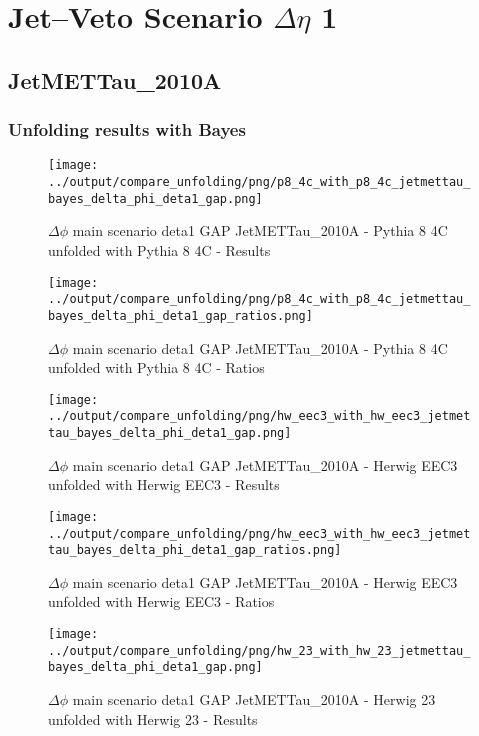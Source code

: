 \documentclass[11pt]{book}
\begin{document}
\cleardoublepage
\chapter{Jet--Veto Scenario $\Delta\eta$ 1}
\section{JetMETTau\_2010A}
\subsection{Unfolding results with Bayes}

\begin{figure}[ht]
\centering
\texttt{[image: ../output/compare\_unfolding/png/p8\_4c\_with\_p8\_4c\_jetmettau\_bayes\_delta\_phi\_deta1\_gap.png]}
\caption{$\Delta\phi$ main scenario deta1 GAP JetMETTau\_2010A - Pythia 8 4C unfolded with Pythia 8 4C - Results}
\label{p8_p8_jetmettau_bayes_delta_phi_deta1_gap_a}
\end{figure}

\begin{figure}[ht]
\centering
\texttt{[image: ../output/compare\_unfolding/png/p8\_4c\_with\_p8\_4c\_jetmettau\_bayes\_delta\_phi\_deta1\_gap\_ratios.png]}
\caption{$\Delta\phi$ main scenario deta1 GAP JetMETTau\_2010A - Pythia 8 4C unfolded with Pythia 8 4C - Ratios}
\label{p8_p8_jetmettau_bayes_delta_phi_deta1_gap_b}
\end{figure}

\begin{figure}[ht]
\centering
\texttt{[image: ../output/compare\_unfolding/png/hw\_eec3\_with\_hw\_eec3\_jetmettau\_bayes\_delta\_phi\_deta1\_gap.png]}
\caption{$\Delta\phi$ main scenario deta1 GAP JetMETTau\_2010A - Herwig EEC3 unfolded with Herwig EEC3 - Results}
\label{hw_eec3_hw_eec3_jetmettau_bayes_delta_phi_deta1_gap_a}
\end{figure}

\begin{figure}[ht]
\centering
\texttt{[image: ../output/compare\_unfolding/png/hw\_eec3\_with\_hw\_eec3\_jetmettau\_bayes\_delta\_phi\_deta1\_gap\_ratios.png]}
\caption{$\Delta\phi$ main scenario deta1 GAP JetMETTau\_2010A - Herwig EEC3 unfolded with Herwig EEC3 - Ratios}
\label{hw_eec3_hw_eec3_jetmettau_bayes_delta_phi_deta1_gap_b}
\end{figure}

\begin{figure}[ht]
\centering
\texttt{[image: ../output/compare\_unfolding/png/hw\_23\_with\_hw\_23\_jetmettau\_bayes\_delta\_phi\_deta1\_gap.png]}
\caption{$\Delta\phi$ main scenario deta1 GAP JetMETTau\_2010A - Herwig 23 unfolded with Herwig 23 - Results}
\label{hw_23_hw_23_jetmettau_bayes_delta_phi_deta1_gap_a}
\end{figure}
\end{document}
